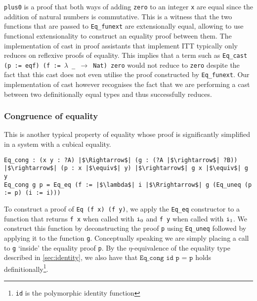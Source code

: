 \documentclass[12pt,twoside,maitrise]{dms}
\theoremstyle{definition}
\numberwithin{equation}{section}
\numberwithin{table}{chapter}
\numberwithin{figure}{chapter}
\newcommand\id[1] {\texttt{#1}}
\newcommand\fn[1] {\texttt{#1}}
\begin{document}
\id{plus0} is a proof that both ways of adding \id{zero} to an integer \id{x}
are equal since the addition of natural numbers is commutative. This is a
witness that the two functions that are passed to \id{Eq\_funext} are
extensionally equal, allowing to use functional extensionality to construct an
equality proof between them. The implementation of cast in proof assistants that
implement ITT typically only reduces on reflexive proofs of equality. This
implies that a term such as \fn{Eq\_cast (p := eqf) (f := $\lambda$ \_
  $\rightarrow$ Nat) zero} would not reduce to \id{zero} despite the fact that
this cast does not even utilise the proof constructed by \id{Eq\_funext}. Our
implementation of cast however recognises the fact that we are performing a cast
between two definitionally equal types and thus successfully reduces.

\subsubsection*{Congruence of equality}\label{subsec:congruence-eq}
This is another typical property of equality whose proof is significantly
simplified in a system with a cubical equality.

\begin{verbatim}
Eq_cong : (x y : ?A) |$\Rightarrow$| (g : (?A |$\rightarrow$| ?B)) |$\rightarrow$| (p : x |$\equiv$| y) |$\rightarrow$| g x |$\equiv$| g y
Eq_cong g p = Eq_eq (f := |$\lambda$| i |$\Rrightarrow$| g (Eq_uneq (p := p) (i := i)))
\end{verbatim}

To construct a proof of \fn{Eq (f x) (f y)}, we apply the \id{Eq\_eq}
constructor to a function that returns \fn{f x} when called with $\ileft$ and
\fn{f y} when called with $\iright$. We construct this function by
deconstructing the proof \id{p} using \id{Eq\_uneq} followed by applying it to
the function \id{g}. Conceptually speaking we are simply placing a call to
\id{g} `inside' the equality proof \id{p}. By the $\eta$-equivalence of the
equality type described in \autoref{sec:identity}, we also have that
$\fn{Eq\_cong id p = p}$ holds definitionally\footnote{\id{id} is the
polymorphic identity function}.

\end{document}
